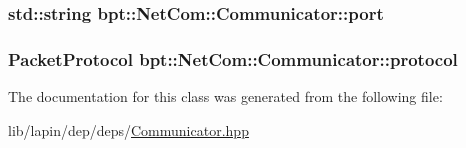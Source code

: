 \hypertarget{classbpt_1_1_net_com_1_1_communicator_a6b6676ed095581315ffc75dd7d9a1ceb}{
\subsubsection[{port}]{\setlength{\rightskip}{0pt plus 5cm}std\-::string bpt\-::\-Net\-Com\-::\-Communicator\-::port\hspace{0.3cm}{\ttfamily [protected]}}}\label{classbpt_1_1_net_com_1_1_communicator_a6b6676ed095581315ffc75dd7d9a1ceb}
\hypertarget{classbpt_1_1_net_com_1_1_communicator_aac1e2e8c0b91c11f347c042e56f46041}{
\subsubsection[{protocol}]{ {\bf Packet\-Protocol} bpt\-::\-Net\-Com\-::\-Communicator\-::protocol\hspace{0.3cm}{\ttfamily [protected]}}}\label{classbpt_1_1_net_com_1_1_communicator_aac1e2e8c0b91c11f347c042e56f46041}


The documentation for this class was generated from the following file\-:\begin{DoxyCompactItemize}
\item 
lib/lapin/dep/deps/\hyperlink{_communicator_8hpp}{Communicator.\-hpp}\end{DoxyCompactItemize}
